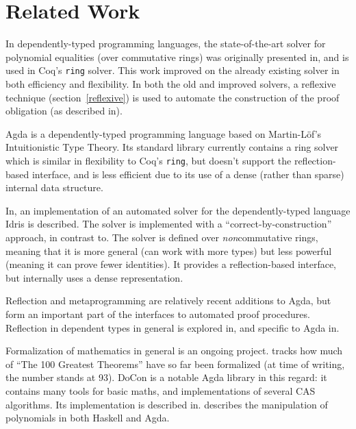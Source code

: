 \documentclass[draft, twocolumn]{article}
\theoremstyle{definition}
\theoremstyle{definition}
\begin{document}
\section{Related Work}
In dependently-typed programming languages, the state-of-the-art solver for
polynomial equalities (over commutative rings) was originally presented
in\cite{gregoire_proving_2005}, and is used in Coq's \verb+ring+ solver. This
work improved on the already existing solver\cite{Coq:manual} in both efficiency
and flexibility. In both the old and improved solvers, a reflexive technique
(section~\ref{reflexive}) is used to automate the construction of the proof
obligation (as described in\cite{boutin_using_1997}).

Agda\cite{norell_dependently_2008} is a dependently-typed programming language
based on Martin-Löf's Intuitionistic Type
Theory\cite{martin-lof_intuitionistic_1980}. Its standard
library\cite{danielsson_agda_2018} currently contains a ring solver which is
similar in flexibility to Coq's \verb+ring+, but doesn't support the
reflection-based interface, and is less efficient due to its use of a dense
(rather than sparse) internal data structure.

In\cite{geuvers_automatically_2017}, an implementation of an automated solver
for the dependently-typed language Idris\cite{brady_idris_2013} is described.
The solver is implemented with a ``correct-by-construction'' approach, in
contrast to\cite{gregoire_proving_2005}. The solver is defined over
\emph{non}commutative rings, meaning that it is more general (can work with more
types) but less powerful (meaning it can prove fewer identities). It provides a
reflection-based interface, but internally uses a dense representation.

Reflection and metaprogramming are relatively recent additions to Agda, but form
an important part of the interfaces to automated proof procedures. Reflection in
dependent types in general is explored in\cite{christiansen_practical_2015}, and
specific to Agda in\cite{van_der_walt_reflection_2012}.

Formalization of mathematics in general is an ongoing project.
\cite{wiedijk_formalizing_2018} tracks how much of ``The 100 Greatest Theorems''
\cite{kahl_hundred_2004} have so far been formalized (at time of writing, the
number stands at 93). DoCon\cite{meshveliani_docon-provable_2018} is a notable
Agda library in this regard: it contains many tools for basic maths, and
implementations of several CAS algorithms. Its implementation is described
in\cite{meshveliani_dependent_2013}. \cite{cheng_functional_2018} describes the
manipulation of polynomials in both Haskell and Agda.
\end{document}
